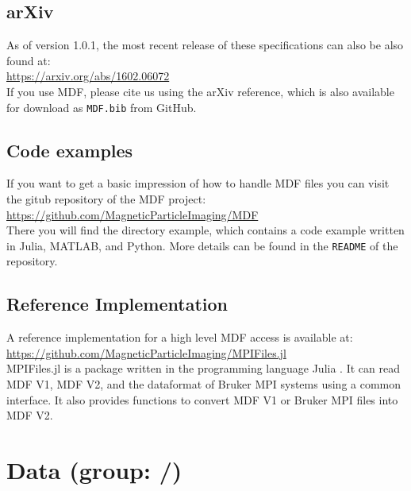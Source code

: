 \documentclass[landscape,a4paper]{article} %
\newcommand{\inlvar}[1]{{\ttfamily#1}}
\begin{document}
\begin{multicols}{2}
\subsection{arXiv}
As of version 1.0.1, the most recent release of these specifications can also be also found at:\\
\hspace*{1cm}\url{https://arxiv.org/abs/1602.06072}\\
If you use MDF, please cite us using the arXiv reference, which is also available for download as \texttt{MDF.bib} from GitHub.


\subsection{Code examples}		 
  		  
If you want to get a basic impression of how to handle MDF files you can visit the gitub repository of the MDF project:\\		
  \hspace*{1cm}\url{https://github.com/MagneticParticleImaging/MDF}\\	
There you will find the directory example, which contains a code example written in Julia, MATLAB, and Python. More details can be found in the \texttt{README} of the repository.
 
\subsection{Reference Implementation}		 

A reference implementation for a high level MDF access is available at:\\
  \hspace*{1cm}\url{https://github.com/MagneticParticleImaging/MPIFiles.jl}\\	
\inlvar{MPIFiles.jl} is a package written in the programming language Julia \cite{Bezanson2012,Bezanson2014,Bezanson2014a}. It can read MDF V1, MDF V2, and the dataformat of Bruker MPI systems using a common interface. It also provides functions to convert MDF V1 or Bruker MPI files into MDF V2.

\end{multicols}

\clearpage

\section{Data (group: \inlvar{/})}
 \setlength\extrarowheight{5pt}
\end{document}
